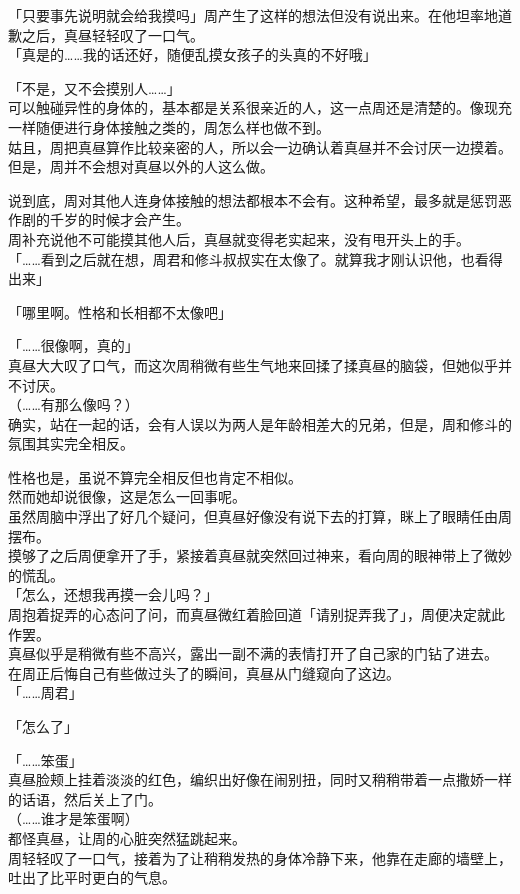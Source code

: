 「只要事先说明就会给我摸吗」周产生了这样的想法但没有说出来。在他坦率地道歉之后，真昼轻轻叹了一口气。\\

「真是的……我的话还好，随便乱摸女孩子的头真的不好哦」

「不是，又不会摸别人……」\\

可以触碰异性的身体的，基本都是关系很亲近的人，这一点周还是清楚的。像现充一样随便进行身体接触之类的，周怎么样也做不到。\\

姑且，周把真昼算作比较亲密的人，所以会一边确认着真昼并不会讨厌一边摸着。但是，周并不会想对真昼以外的人这么做。

说到底，周对其他人连身体接触的想法都根本不会有。这种希望，最多就是惩罚恶作剧的千岁的时候才会产生。\\

周补充说他不可能摸其他人后，真昼就变得老实起来，没有甩开头上的手。\\

「……看到之后就在想，周君和修斗叔叔实在太像了。就算我才刚认识他，也看得出来」

「哪里啊。性格和长相都不太像吧」

「……很像啊，真的」\\

真昼大大叹了口气，而这次周稍微有些生气地来回揉了揉真昼的脑袋，但她似乎并不讨厌。\\

（……有那么像吗？）\\

确实，站在一起的话，会有人误以为两人是年龄相差大的兄弟，但是，周和修斗的氛围其实完全相反。

性格也是，虽说不算完全相反但也肯定不相似。\\

然而她却说很像，这是怎么一回事呢。\\

虽然周脑中浮出了好几个疑问，但真昼好像没有说下去的打算，眯上了眼睛任由周摆布。\\

摸够了之后周便拿开了手，紧接着真昼就突然回过神来，看向周的眼神带上了微妙的慌乱。\\

「怎么，还想我再摸一会儿吗？」\\

周抱着捉弄的心态问了问，而真昼微红着脸回道「请别捉弄我了」，周便决定就此作罢。\\

真昼似乎是稍微有些不高兴，露出一副不满的表情打开了自己家的门钻了进去。\\

在周正后悔自己有些做过头了的瞬间，真昼从门缝窥向了这边。\\

「……周君」

「怎么了」

「……笨蛋」\\

真昼脸颊上挂着淡淡的红色，编织出好像在闹别扭，同时又稍稍带着一点撒娇一样的话语，然后关上了门。\\

（……谁才是笨蛋啊）\\

都怪真昼，让周的心脏突然猛跳起来。\\

周轻轻叹了一口气，接着为了让稍稍发热的身体冷静下来，他靠在走廊的墙壁上，吐出了比平时更白的气息。

